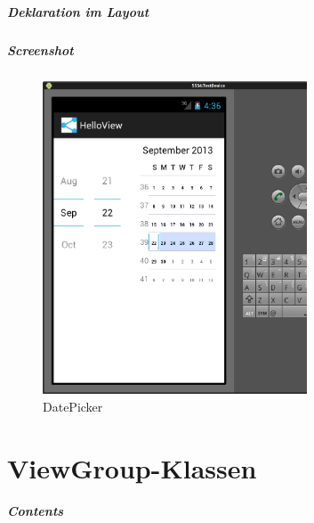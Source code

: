 \begin{frame}
   \frametitle{Deklaration im Layout}
   
\end{frame}

\begin{frame}
   \frametitle{Screenshot}
   \begin{figure}[h!]
     \centering
     \includegraphics[width=0.7\textwidth]{pictures/datepicker.ps}
     \caption{
        DatePicker
     }
     \label{fig:datepicker}
   \end{figure}
\end{frame}

\part{ViewGroup-Klassen}
\frame{\partpage}
\begin{frame}
	\frametitle{Contents}
	\tableofcontents[]
\end{frame}


